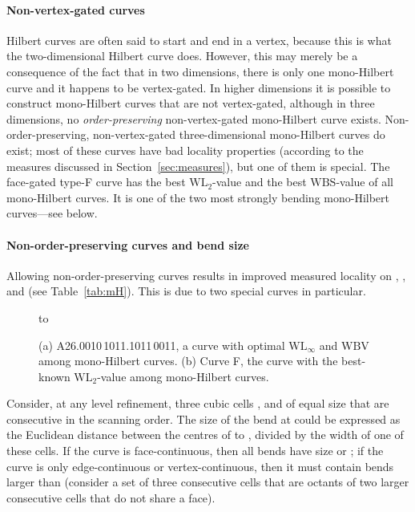 \documentclass[11pt,a4paper]{article}
\def\WLMax{\ensuremath{\mathrm{WL}_\infty}\xspace}
\def\WLEuc{\ensuremath{\mathrm{WL}_2}\xspace}
\def\WBV{\ensuremath{\mathrm{WBV}}\xspace}
\def\WBS{\ensuremath{\mathrm{WBS}}\xspace}
\begin{document}
\paragraph{Non-vertex-gated curves}
Hilbert curves are often said to start and end in a vertex, because this is what the two-dimensional Hilbert curve does. However, this may merely be a consequence of the fact that in two dimensions, there is only one mono-Hilbert curve and it happens to be vertex-gated. In higher dimensions it is possible to construct mono-Hilbert curves that are not vertex-gated, although in three dimensions, no \emph{order-preserving} non-vertex-gated mono-Hilbert curve exists. Non-order-preserving, non-vertex-gated three-dimensional mono-Hilbert curves do exist; most of these curves have bad locality properties (according to the measures discussed in Section~\ref{sec:measures}), but one of them is special. The face-gated type-F curve has the best \WLEuc-value and the best \WBS-value of all mono-Hilbert curves. It is one of the two most strongly bending mono-Hilbert curves---see below.

\paragraph{Non-order-preserving curves and bend size}
Allowing non-order-preserving curves results in improved measured locality on , , and  (see Table~\ref{tab:mH}). This is due to two special curves in particular.

\begin{figure}
\centering
\hbox to \hsize{\hfill
\texttt{[image: A26-2b-b3]}\hfill
\texttt{[image: F]}\hfill
}
\caption{(a) A26.0010\,1011.1011\,0011, a curve with optimal \WLMax and \WBV among mono-Hilbert curves.
(b) Curve F, the curve with the best-known \WLEuc-value among mono-Hilbert curves.}
\label{fig:reversing-curves}\label{fig:A26.2b.b3}
\end{figure}

Consider, at any level refinement, three cubic cells ,  and  of equal size that are consecutive in the scanning order. The size of the bend at  could be expressed as the Euclidean distance between the centres of  to , divided by the width of one of these cells. If the curve is face-continuous, then all bends have size  or ; if the curve is only edge-continuous or vertex-continuous, then it must contain bends larger than  (consider a set of three consecutive cells that are octants of two larger consecutive cells that do not share a face).
\end{document}
